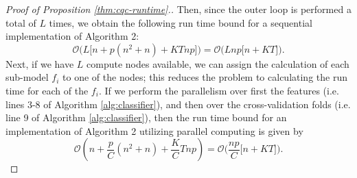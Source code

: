 \begin{proof}[Proof of Proposition \ref{thm:cqc-runtime}.]
  Then, since the outer loop is performed a total of $L$ times, we obtain the
  following run time bound for a sequential implementation of Algorithm 2:
  \begin{equation}
    \label{eq:classifier-runtime}
    \mathcal{O}\Big( L \Big[ n + p(n^2 + n) + KTnp \Big] \Big)
    = \mathcal{O}\Big( Lnp \big[ n + KT \big] \Big).
  \end{equation}
  Next, if we have $L$ compute nodes available, we can assign the calculation of
  each sub-model $f_i$ to one of the nodes; this reduces the problem to
  calculating the run time for each of the $f_i$.  If we perform the parallelism
  over first the features (i.e. lines 3-8 of Algorithm \ref{alg:classifier}),
  and then over the cross-validation folds (i.e. line 9 of Algorithm
  \ref{alg:classifier}), then the run time bound for an implementation of
  Algorithm 2 utilizing parallel computing is given by
  \begin{equation}
    \label{eq:classifier-runtime-parallel}
    \mathcal{O}\left( n + \frac{p}{C} (n^2 + n) + \frac{K}{C} Tnp \right) 
    = \mathcal{O}\Big( \frac{np}{C} \big[ n + KT \big] \Big).
  \end{equation}
  
\end{proof}



